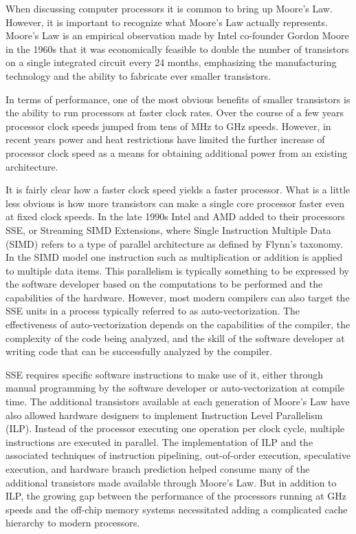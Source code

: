 \documentclass[preprint,sort&compress]{elsarticle}
\begin{document}
When discussing computer processors it is common to bring up Moore's Law.  However, it is important to recognize what Moore's Law actually represents.  Moore's Law is an empirical observation made by Intel co-founder Gordon Moore in the 1960s that it was economically feasible to double the number of transistors on a single integrated circuit every 24 months,
emphasizing the manufacturing technology and the ability to fabricate ever smaller transistors.


In terms of performance, one of the most obvious benefits of smaller transistors is the ability to run processors at faster clock rates.  Over the course of a few years processor clock speeds jumped from tens of MHz to GHz speeds.  However, in recent years power and heat restrictions have limited the further increase of processor clock speed as a means for obtaining additional power from an existing architecture.

It is fairly clear how a faster clock speed yields a faster processor.  What is a little less obvious is how more transistors can make a single core processor faster even at fixed clock speeds.  In the late 1990s Intel and AMD added to their processors SSE, or Streaming SIMD Extensions, where Single Instruction Multiple Data (SIMD)
refers to a type of parallel architecture as defined by Flynn's taxonomy.  In the SIMD  model one instruction such as multiplication or addition is applied to multiple data items.  This parallelism is typically something to be expressed by the software developer based on the computations to be performed and the capabilities of the hardware.  However, most modern compilers can also target the SSE units in a process typically referred to as auto-vectorization.  The effectiveness of auto-vectorization depends on the capabilities of the compiler, the complexity of the code being analyzed, and the skill of the software developer at writing code that can be successfully analyzed by the compiler.

SSE requires specific software instructions to make use of it, either through manual programming by the software developer or auto-vectorization at compile time.  The additional transistors available at each generation of Moore's Law have also allowed hardware designers to implement Instruction Level Parallelism (ILP).  Instead of the processor executing one operation per clock cycle, multiple instructions are executed in parallel. The implementation of ILP and the associated techniques of instruction pipelining, out-of-order execution, speculative execution, and hardware branch prediction helped consume many of the additional transistors made available through Moore's Law.  But in addition to ILP, the growing gap between the performance of the processors running at GHz speeds and the off-chip memory systems necessitated adding a complicated cache hierarchy to modern processors.
\end{document}
